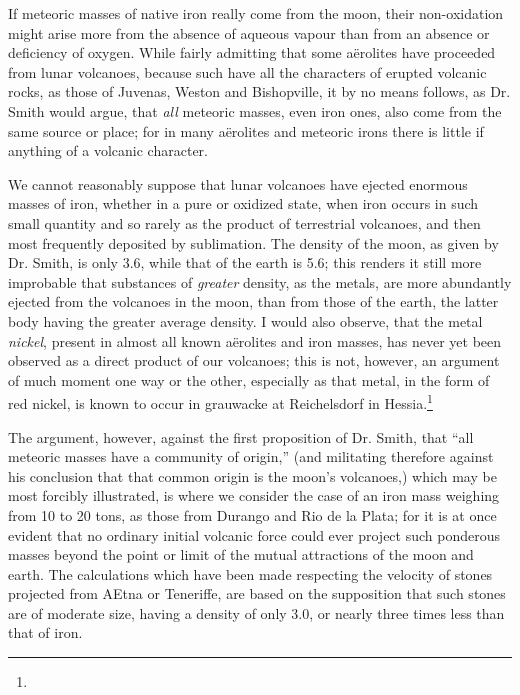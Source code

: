 \documentclass[a4paper, 12pt, oneside]{article}
\begin{document}
If meteoric masses of native iron really come from the moon, their non-oxidation might arise more from the absence of aqueous vapour than from an absence or deficiency of oxygen. While fairly admitting that some aërolites have proceeded from lunar volcanoes, because such have all the characters of erupted volcanic rocks, as those of Juvenas, Weston and Bishopville, it by no means follows, as Dr. Smith would argue, that \emph{all} meteoric masses, even iron ones, also come from the same source or place; for in many aërolites and meteoric irons there is little if anything of a volcanic character.

We cannot reasonably suppose that lunar volcanoes have ejected enormous masses of iron, whether in a pure or oxidized state, when iron occurs in such small quantity and so rarely as the product of terrestrial volcanoes, and then most frequently deposited by sublimation. The density of the moon, as given by Dr. Smith, is only 3.6, while that of the earth is 5.6; this renders it still more improbable that substances of \emph{greater} density, as the metals, are more abundantly ejected from the volcanoes in the moon, than from those of the earth, the latter body having the greater average density. I would also observe, that the metal \emph{nickel}, present in almost all known aërolites and iron masses, has never yet been observed as a direct product of our volcanoes; this is not, however, an argument of much moment one way or the other, especially as that metal, in the form of red nickel, is known to occur in grauwacke at Reichelsdorf in Hessia.\footnote{}

The argument, however, against the first proposition of Dr. Smith, that ``all meteoric masses have a community of origin,'' (and militating therefore against his conclusion that that common origin is the moon's volcanoes,) which may be most forcibly illustrated, is where we consider the case of an iron mass weighing from 10 to 20 tons, as those from Durango and Rio de la Plata; for it is at once evident that no ordinary initial volcanic force could ever project such ponderous masses beyond the point or limit of the mutual attractions of the moon and earth. The calculations which have been made respecting the velocity of stones projected from AEtna or Teneriffe, are based on the supposition that such stones are of moderate size, having a density of only 3.0, or nearly three times less than that of iron.
\end{document}
